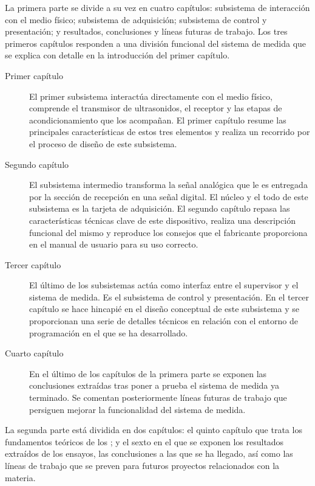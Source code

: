 La primera parte se divide a su vez en cuatro capítulos: subsistema de
interacción con el medio físico; subsistema de adquisición; subsistema de
control y presentación; y resultados, conclusiones y líneas futuras de
trabajo. Los tres primeros capítulos responden a una división funcional del
sistema de medida que se explica con detalle en la introducción del primer
capítulo.


\begin{description}
	\item[Primer capítulo] El primer subsistema interactúa directamente
		con el medio físico, comprende el transmisor de
		ultrasonidos, el receptor y las etapas de acondicionamiento
		que los acompañan. El primer capítulo resume las
		principales características de estos tres elementos y
		realiza un recorrido por el proceso de diseño de este
		subsistema.
	\item[Segundo capítulo] El subsistema intermedio transforma la
		señal analógica que le es entregada por la sección de
		recepción en una señal digital.  El núcleo y el todo de
		este subsistema es la tarjeta de adquisición. El segundo
		capítulo repasa las características técnicas clave de este
		dispositivo, realiza una descripción funcional del mismo y
		reproduce los consejos que el fabricante proporciona en el
		manual de usuario para su uso correcto.
	\item[Tercer capítulo] El último de los subsistemas actúa como
		interfaz entre el supervisor y el sistema de medida. Es el
		subsistema de control y presentación. En el tercer capítulo
		se hace hincapié en el diseño conceptual de este subsistema
		y se proporcionan una serie de detalles técnicos en
		relación con el entorno de programación en el que se ha
		desarrollado.
	\item[Cuarto capítulo] En el último de los capítulos de la primera
		parte se exponen las conclusiones extraídas tras poner a
		prueba el sistema de medida ya terminado. Se comentan
		posteriormente líneas futuras de trabajo que persiguen
		mejorar la funcionalidad del sistema de medida.
\end{description}

La segunda parte está dividida en dos capítulos: el quinto capítulo que
trata los fundamentos teóricos de los ; y el sexto en el que se
exponen los resultados extraídos de los ensayos, las conclusiones a las que
se ha llegado, así como las líneas de trabajo que se preven para futuros
proyectos relacionados con la materia.%


